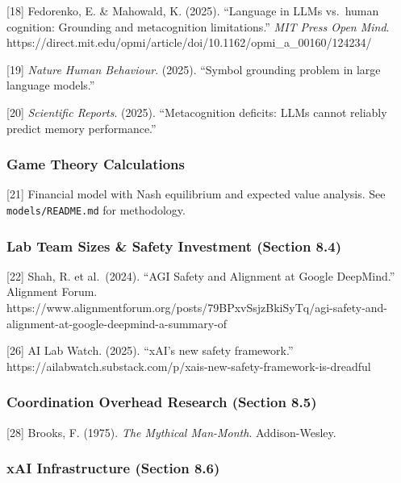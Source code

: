 \documentclass[
]{article}
\begin{document}
{[}18{]} Fedorenko, E. \& Mahowald, K. (2025). ``Language in LLMs
vs.~human cognition: Grounding and metacognition limitations.''
\emph{MIT Press Open Mind}.
https://direct.mit.edu/opmi/article/doi/10.1162/opmi\_a\_00160/124234/

{[}19{]} \emph{Nature Human Behaviour}. (2025). ``Symbol grounding
problem in large language models.''

{[}20{]} \emph{Scientific Reports}. (2025). ``Metacognition deficits:
LLMs cannot reliably predict memory performance.''

\hypertarget{game-theory-calculations}{%
\subsubsection{Game Theory
Calculations}\label{game-theory-calculations}}

{[}21{]} Financial model with Nash equilibrium and expected value
analysis. See \texttt{models/README.md} for methodology.

\hypertarget{lab-team-sizes-safety-investment-section-8.4}{%
\subsubsection{Lab Team Sizes \& Safety Investment (Section
8.4)}\label{lab-team-sizes-safety-investment-section-8.4}}

{[}22{]} Shah, R. et al.~(2024). ``AGI Safety and Alignment at Google
DeepMind.'' Alignment Forum.
https://www.alignmentforum.org/posts/79BPxvSsjzBkiSyTq/agi-safety-and-alignment-at-google-deepmind-a-summary-of

{[}26{]} AI Lab Watch. (2025). ``xAI's new safety framework.''
https://ailabwatch.substack.com/p/xais-new-safety-framework-is-dreadful

\hypertarget{coordination-overhead-research-section-8.5}{%
\subsubsection{Coordination Overhead Research (Section
8.5)}\label{coordination-overhead-research-section-8.5}}

{[}28{]} Brooks, F. (1975). \emph{The Mythical Man-Month}.
Addison-Wesley.

\hypertarget{xai-infrastructure-section-8.6}{%
\subsubsection{xAI Infrastructure (Section
8.6)}\label{xai-infrastructure-section-8.6}}
\end{document}

